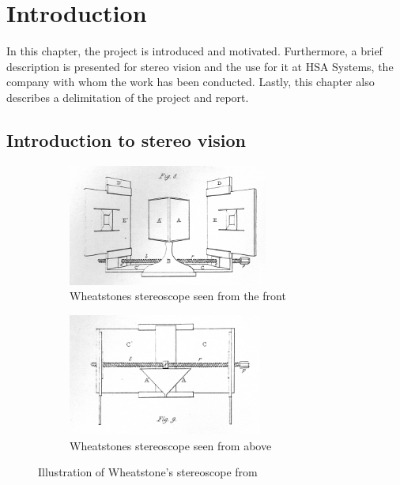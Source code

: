 \chapter{Introduction}\label{ch:introduction}
In this chapter, the project is introduced and motivated. Furthermore, a brief description is presented for stereo vision and the use for it at HSA Systems, the company with whom the work has been conducted. Lastly, this chapter also describes a delimitation of the project and report.\\

\section{Introduction to stereo vision}\label{sec:stereo vision}
\begin{figure}[ht!]
  \centering
  \begin{subfigure}[t]{0.45\textwidth}
    \centering\includegraphics[height=4cm]{figures/paper1-fig08}
    \caption{Wheatstones stereoscope seen from the front\label{fig:wheatstef}}
  \end{subfigure}\hspace{0.5cm}
  \begin{subfigure}[t]{0.45\textwidth}
    \centering\includegraphics[height=4cm]{figures/paper1-fig09}
    \caption{Wheatstones stereoscope seen from above\label{fig:wheatstet}}
  \end{subfigure}
  \caption{Illustration of Wheatstone's stereoscope from \cite{wheatstone1838contributions}\label{fig:wheatsteall}}
\end{figure}
